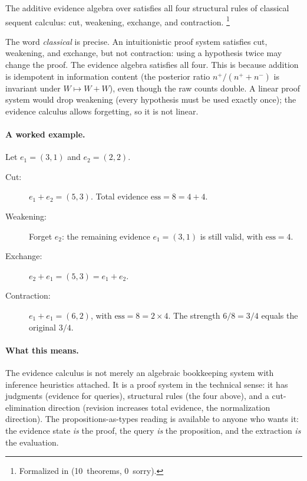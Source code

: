 \documentclass[11pt,openany]{report}
\begin{document}
\begin{theorem}
\label{thm:structural-rules}
The additive evidence algebra over  satisfies all four
structural rules of classical sequent calculus: cut, weakening,
exchange, and contraction.%
\footnote{Formalized in
(10~theorems, 0~sorry).}
\end{theorem}

\noindent
The word \emph{classical} is precise.  An intuitionistic proof system
satisfies cut, weakening, and exchange, but not contraction: using a
hypothesis twice may change the proof.  The evidence algebra satisfies
all four.  This is because addition is idempotent in information
content (the posterior ratio $n^+ / (n^+ + n^-)$ is invariant under
$W \mapsto W + W$), even though the raw counts double.  A linear
proof system would drop weakening (every hypothesis must be used
exactly once); the evidence calculus allows forgetting, so it is not
linear.

\paragraph{A worked example.}
Let $e_1 = (3, 1)$ and $e_2 = (2, 2)$.

\smallskip
\begin{description}
\item[Cut:]  $e_1 + e_2 = (5, 3)$.  Total evidence
  $\mathrm{ess} = 8 = 4 + 4$.
\item[Weakening:]  Forget $e_2$: the remaining evidence
  $e_1 = (3, 1)$ is still valid, with $\mathrm{ess} = 4$.
\item[Exchange:]  $e_2 + e_1 = (5, 3) = e_1 + e_2$.
\item[Contraction:]  $e_1 + e_1 = (6, 2)$, with
  $\mathrm{ess} = 8 = 2 \times 4$.  The strength
  $6/8 = 3/4$ equals the original $3/4$.
\end{description}

\paragraph{What this means.}
The evidence calculus is not merely an algebraic bookkeeping system
with inference heuristics attached.  It is a proof system in the
technical sense: it has judgments (evidence for queries), structural
rules (the four above), and a cut-elimination direction (revision
increases total evidence, the normalization direction).  The
propositions-as-types reading is available to anyone who wants it:
the evidence state \emph{is} the proof, the query \emph{is} the
proposition, and the extraction \emph{is} the evaluation.
\end{document}
